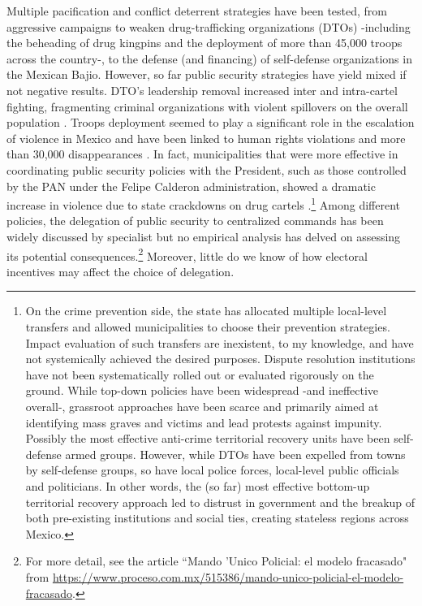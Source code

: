 \documentclass[12pt]{amsart}
\numberwithin{equation}{section}
\theoremstyle{definition}
\theoremstyle{definition}
\theoremstyle{definition}
\begin{document}
Multiple pacification and conflict deterrent strategies have been tested, from aggressive campaigns to weaken drug-trafficking organizations (DTOs) -including the beheading of drug kingpins and the deployment of more than 45,000 troops across the country-, to the defense (and financing) of self-defense organizations in the Mexican Bajio. However, so far public security strategies have yield mixed if not negative results. DTO's leadership removal increased inter and intra-cartel fighting, fragmenting criminal organizations with violent spillovers on the overall population \citep{guerrero_2011}. Troops deployment seemed to play a significant role in the escalation of violence in Mexico \citep{escalante_2011} and have been linked to human rights violations and more than 30,000 disappearances \citep{daly_etal_2012, moloeznik_etal_2012, magaloni_magaloni_razu_2018}. In fact, municipalities that were more effective in coordinating public security policies with the President, such as those controlled by the PAN under the Felipe Calderon administration, showed a dramatic increase in violence due to state crackdowns on drug cartels \citep{dell_2015}.\footnote{On the crime prevention side, the state has allocated multiple local-level transfers and allowed municipalities to choose their prevention strategies. Impact evaluation of such transfers are inexistent, to my knowledge, and have not systemically achieved the desired purposes. Dispute resolution institutions have not been systematically rolled out or evaluated rigorously on the ground. While top-down policies have been widespread -and ineffective overall-, grassroot approaches have been scarce and primarily aimed at identifying mass graves and victims and lead protests against impunity. Possibly the most effective anti-crime territorial recovery units have been self-defense armed groups. However, while DTOs have been expelled from towns by self-defense groups, so have local police forces, local-level public officials and politicians. In other words, the (so far) most effective bottom-up territorial recovery approach led to distrust in government and the breakup of both pre-existing institutions and social ties, creating stateless regions across Mexico.} Among different policies, the delegation of public security to centralized commands has been widely discussed by specialist but no empirical analysis has delved on assessing its potential consequences.\footnote{For more detail, see the article ``Mando 'Unico Policial: el modelo fracasado" from \url{https://www.proceso.com.mx/515386/mando-unico-policial-el-modelo-fracasado}.}  Moreover, little do we know of how electoral incentives may affect the choice of delegation.
\end{document}
